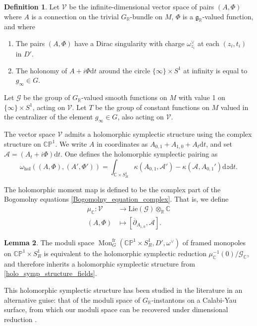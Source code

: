 \documentclass[11pt, oneside, reqno]{amsart}
\theoremstyle{definition} \newtheorem{definition}{Definition}[section]
\newtheorem{lemma}[definition]{Lemma}
\theoremstyle{definition} \newtheorem{remark}[definition]{Remark}
\theoremstyle{definition} \newtheorem{remarks}[definition]{Remarks}
\theoremstyle{definition} \newtheorem{question}[definition]{Question}
\theoremstyle{definition} \newtheorem*{note}{Note}
\theoremstyle{definition} \newtheorem{example}[definition]{Example}
\theoremstyle{definition} \newtheorem{examples}[definition]{Examples}
\renewcommand{\gg}{\mathfrak{g}}
\newcommand{\bb}[1]{\mathbb{#1}}
\newcommand{\mr}[1]{\mathrm{#1}}
\newcommand{\mc}[1]{\mathcal{#1}}
\newcommand{\del}{\partial}
\newcommand{\ol}[1]{\overline{#1}}
\newcommand{\CC}{\mathbb{C}}
\newcommand{\RR}{\mathbb{R}}
\DeclareMathOperator{\mon}{Mon}
\renewcommand{\d}{\mathrm{d}}
\newcommand{\fr}{\mathrm{fr}}
\begin{document}
\begin{definition}
Let $\mc V$ be the infinite-dimensional vector space of pairs $(A,\Phi)$ where $A$ is a connection on the trivial $G_\RR$-bundle on $M$, $\Phi$ is a $\gg_\RR$-valued function, and where 
\begin{enumerate}
 \item The pairs $(A,\Phi)$ have a Dirac singularity with charge $\omega^\vee_{z_i}$ at each $(z_i,t_i)$ in $D'$.
 \item The holonomy of $A + i \Phi \d t$ around the circle $\{\infty\} \times S^1$ at infinity is equal to $g_\infty \in G$. 
\end{enumerate}
  Let $\mc G$ be the group of $G_\RR$-valued smooth functions on $M$ with value 1 on $\{\infty\} \times S^1$, acting on $\mc V$.  Let $T$ be the group of constant functions on $M$ valued in the centralizer of the element $g_\infty \in G$, also acting on $\mc V$.
\end{definition}

The vector space $\mc V$ admits a holomorphic symplectic structure using the complex structure on $\bb{CP}^1$.  We write $A$ in coordinates as $A_{0,1} + A_{1,0}  + A_t \d t$, and set $\mc A = (A_t + i \Phi) \d t$. One defines the holomorphic symplectic pairing as
\begin{equation}
 \label{holo_symp_structure_fields}
 \omega_{\mr{hol}}((A,\Phi), (A',\Phi')) = \int_{\CC \times S^1_R} \kappa(A_{0,1}, \mc A') - \kappa(\mc A, A_{0,1}') \d z \d t.
\end{equation}

The holomorphic moment map is defined to be the complex part of the Bogomolny equations \ref{Bogomolny_equation_complex}.  That is, we define
\begin{align*}
\mu_\CC \colon \mc V &\to \mr{Lie}(\mc G) \otimes_\RR \CC \\
(A,\Phi) &\mapsto [\ol{\del}_{A_{1,0}}, \mc A].
\end{align*}

\begin{lemma}
  The moduli space $\mon^\fr_G(\bb{CP}^1 \times S^1_R, D', \omega^\vee)$ of framed monopoles on $\bb{CP}^1 \times S^1_R$ is equivalent to the holomorphic symplectic reduction $\mu_\CC^{-1}(0)/\mc G_\CC$, and therefore inherits a holomorphic symplectic structure from \ref{holo_symp_structure_fields}. 
\end{lemma}

This holomorphic symplectic structure has been studied in the literature in an alternative guise: that of the moduli space of $G_\RR$-instantons on a Calabi-Yau surface, from which our moduli space can be recovered under dimensional reduction \cite{Mukai1,Mukai2,Bottacin1,Bottacin2, HurtubiseMarkman}.   
\end{document}
